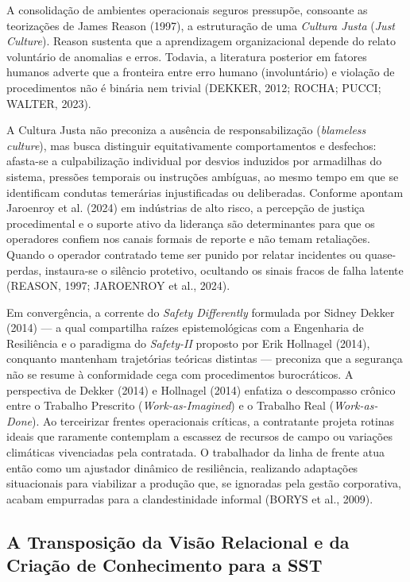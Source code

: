 \documentclass[12pt,a4paper]{article}
\begin{document}
A consolidação de ambientes operacionais seguros pressupõe, consoante as teorizações de James Reason (1997), a estruturação de uma \textit{Cultura Justa} (\textit{Just Culture}). Reason sustenta que a aprendizagem organizacional depende do relato voluntário de anomalias e erros. Todavia, a literatura posterior em fatores humanos adverte que a fronteira entre erro humano (involuntário) e violação de procedimentos não é binária nem trivial (DEKKER, 2012; ROCHA; PUCCI; WALTER, 2023). 

A Cultura Justa não preconiza a ausência de responsabilização (\textit{blameless culture}), mas busca distinguir equitativamente comportamentos e desfechos: afasta-se a culpabilização individual por desvios induzidos por armadilhas do sistema, pressões temporais ou instruções ambíguas, ao mesmo tempo em que se identificam condutas temerárias injustificadas ou deliberadas. Conforme apontam Jaroenroy et al. (2024) em indústrias de alto risco, a percepção de justiça procedimental e o suporte ativo da liderança são determinantes para que os operadores confiem nos canais formais de reporte e não temam retaliações. Quando o operador contratado teme ser punido por relatar incidentes ou quase-perdas, instaura-se o silêncio protetivo, ocultando os sinais fracos de falha latente (REASON, 1997; JAROENROY et al., 2024).

Em convergência, a corrente do \textit{Safety Differently} formulada por Sidney Dekker (2014) — a qual compartilha raízes epistemológicas com a Engenharia de Resiliência e o paradigma do \textit{Safety-II} proposto por Erik Hollnagel (2014), conquanto mantenham trajetórias teóricas distintas — preconiza que a segurança não se resume à conformidade cega com procedimentos burocráticos. A perspectiva de Dekker (2014) e Hollnagel (2014) enfatiza o descompasso crônico entre o Trabalho Prescrito (\textit{Work-as-Imagined}) e o Trabalho Real (\textit{Work-as-Done}). Ao terceirizar frentes operacionais críticas, a contratante projeta rotinas ideais que raramente contemplam a escassez de recursos de campo ou variações climáticas vivenciadas pela contratada. O trabalhador da linha de frente atua então como um ajustador dinâmico de resiliência, realizando adaptações situacionais para viabilizar a produção que, se ignoradas pela gestão corporativa, acabam empurradas para a clandestinidade informal (BORYS et al., 2009).

\subsection{A Transposição da Visão Relacional e da Criação de Conhecimento para a SST}
\end{document}
